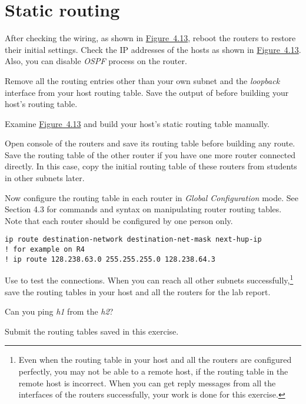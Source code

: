\documentclass{../UTNetLab}
\begin{document}
\section{Static routing}
After checking the wiring, as shown in \hyperref[fig:4.13]{Figure~4.13}, reboot the routers to restore their initial settings.
Check the IP addresses of the hosts as shown in \hyperref[fig:4.13]{Figure~4.13}.
Also, you can disable \textit{OSPF} process on the router.

Remove all the routing entries other than your own subnet and the \textit{loopback} interface from your host routing table.
Save the output of  before building your host’s routing table.

Examine \hyperref[fig:4.13]{Figure~4.13} and build your host’s static routing table manually.

Open console of the routers and save its routing table before building any route.
Save the routing table of the other router if you have one more router connected directly.
In this case, copy the initial routing table of these routers from students in other subnets later.

Now configure the routing table in each router in \textit{Global Configuration} mode.
See Section 4.3 for commands and syntax on manipulating router routing tables.
Note that each router should be configured by one person only.

\begin{lstlisting}[language={cisco}, emph={destination-network, destination-net-mask, next-hup-ip}]
ip route destination-network destination-net-mask next-hup-ip
! for example on R4
! ip route 128.238.63.0 255.255.255.0 128.238.64.3
    \end{lstlisting}

Use  to test the connections.
When you can reach all other subnets successfully,\footnote{Even when the routing table in your host and all the routers are configured perfectly, you may not be able to  a remote host, if the routing table in the remote host is incorrect.
    When you can get  reply messages from all the interfaces of the routers successfully, your work is done for this exercise.} save the routing tables in your host and all the routers for the lab report.

\begin{report}
    \item Can you ping \textit{h1} from the \textit{h2}?

    \item Submit the routing tables saved in this exercise.
\end{report}
\end{document}
